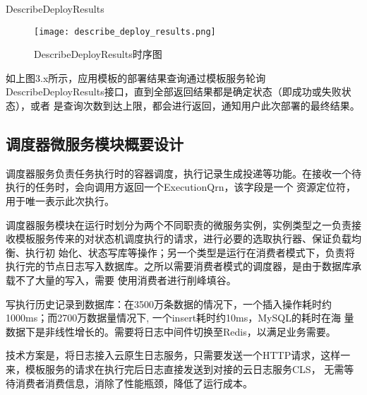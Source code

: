 DescribeDeployResults

\begin{figure}[h]
    \centering
    \texttt{[image: describe\_deploy\_results.png]}
    \caption{DescribeDeployResults时序图}
    \label{fig:DescribeDeployResults时序图}
\end{figure}
如上图3.x所示，应用模板的部署结果查询通过模板服务轮询DescribeDeployResults接口，直到全部返回结果都是确定状态（即成功或失败状态），或者
是查询次数到达上限，都会进行返回，通知用户此次部署的最终结果。

\subsection{调度器微服务模块概要设计}
调度器服务负责任务执行时的容器调度，执行记录生成投递等功能。在接收一个待执行的任务时，会向调用方返回一个ExecutionQrn，该字段是一个
资源定位符，用于唯一表示此次执行。

调度器服务模块在运行时划分为两个不同职责的微服务实例，实例类型之一负责接收模板服务传来的对状态机调度执行的请求，进行必要的选取执行器、保证负载均衡、执行初
始化、状态写库等操作；另一个类型是运行在消费者模式下，负责将执行完的节点日志写入数据库。之所以需要消费者模式的调度器，是由于数据库承载不了大量的写入，需要
使用消费者进行削峰填谷。

写执行历史记录到数据库：在3500万条数据的情况下，一个插入操作耗时约1000ms；而2700万数据量情况下, 一个insert耗时约10ms，MySQL的耗时在海
量数据下是非线性增长的。需要将日志中间件切换至Redis，以满足业务需要。

技术方案是，将日志接入云原生日志服务，只需要发送一个HTTP请求，这样一来，模板服务的请求在执行完后日志直接发送到对接的云日志服务CLS，
无需等待消费者消费信息，消除了性能瓶颈，降低了运行成本。


